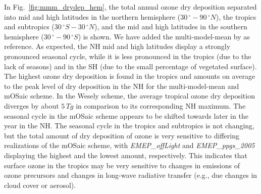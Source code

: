 \documentclass[gmd, manuscript]{copernicus}
\begin{document}
In Fig.~\ref{fig:mmm_drydep_hem}, the total annual ozone dry deposition separated into mid and high latitudes in the northern hemisphere ($30\,\unit{^\circ}-90\,\unit{^\circ N}$), the tropics and subtropics ($30\,\unit{^\circ S}-30\,\unit{^\circ N}$), and the mid and high latitudes in the southern hemisphere ($30\,\unit{^\circ}-90\,\unit{^\circ S}$) is shown. We have added the multi-model-mean by \citet{ACP:Hardacre2015} as reference. As expected, the NH mid and high latitudes display a strongly pronounced seasonal cycle, while it is less pronounced in the tropics (due to the lack of seasons) and in the SH (due to the small percentage of vegetated surface). The highest ozone dry deposition is found in the tropics and amounts on average to the  peak level of dry deposition in the NH for the multi-model-mean \citep{ACP:Hardacre2015} and mOSaic scheme. In the Wesely scheme, the average tropical ozone dry deposition diverges by about $5\,\unit{Tg}$ in comparison to its corresponding NH maximum. The seasonal cycle in the mOSaic scheme appears to be shifted towards later in the year in the NH. The seasonal cycle in the tropics and subtropics is not changing, but the total amount of dry deposition of ozone is very sensitive to differing realizations of the mOSaic scheme, with \emph{EMEP\_offLight} and \emph{EMEP\_ppgs\_2005} displaying the highest and the lowest amount, respectively. This indicates that surface ozone in the tropics may be very sensitive to changes in emissions of ozone precursors and changes in long-wave radiative transfer (e.g., due changes in cloud cover or aerosol).
\end{document}
